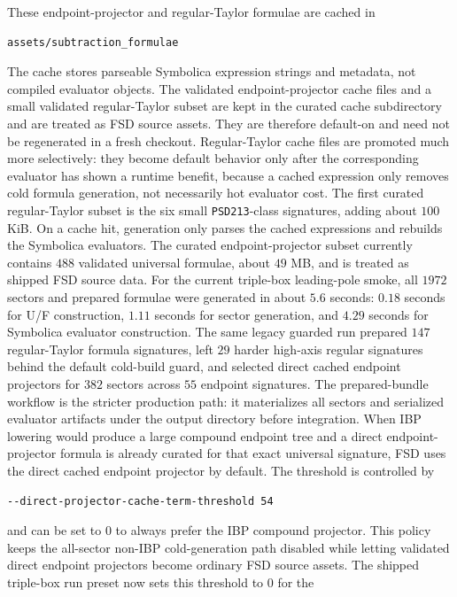 \documentclass[11pt]{article}
\begin{document}
These endpoint-projector and regular-Taylor formulae are cached in
\begin{lstlisting}[style=fsdcode]
assets/subtraction_formulae
\end{lstlisting}
The cache stores parseable Symbolica expression strings and metadata, not
compiled evaluator objects.  The validated endpoint-projector cache files and a
small validated regular-Taylor subset are kept in the curated cache
subdirectory and are treated as FSD source assets.  They are therefore
default-on and need not be regenerated in a fresh checkout.  Regular-Taylor
cache files are promoted much more selectively: they become default behavior
only after the corresponding evaluator has shown a runtime benefit, because a
cached expression only removes cold formula generation, not necessarily hot
evaluator cost.  The first curated regular-Taylor subset is the six small
\texttt{PSD213}-class signatures, adding about \(100\) KiB.  On a cache hit,
generation only parses the cached expressions and rebuilds the Symbolica
evaluators.  The curated endpoint-projector subset currently contains \(488\)
validated universal formulae, about \(49\) MB, and is treated as shipped FSD
source data.  For the current triple-box leading-pole smoke, all \(1972\)
sectors and prepared formulae were generated in about \(5.6\) seconds:
\(0.18\) seconds for U/F construction, \(1.11\) seconds for sector generation,
and \(4.29\) seconds for Symbolica evaluator construction.  The same legacy
guarded run prepared \(147\) regular-Taylor formula signatures, left \(29\)
harder high-axis regular signatures behind the default cold-build guard, and
selected direct cached endpoint projectors for \(382\) sectors across \(55\)
endpoint signatures.  The prepared-bundle workflow is the stricter production
path: it materializes all sectors and serialized evaluator artifacts under the
output directory before integration.
When IBP lowering would produce a large compound endpoint tree and a direct
endpoint-projector formula is already curated for that exact universal
signature, FSD uses the direct cached endpoint projector by default.  The
threshold is controlled by
\begin{lstlisting}[style=fsdcode]
--direct-projector-cache-term-threshold 54
\end{lstlisting}
and can be set to \(0\) to always prefer the IBP compound projector.  This
policy keeps the all-sector non-IBP cold-generation path disabled while letting
validated direct endpoint projectors become ordinary FSD source assets.
The shipped triple-box run preset now sets this threshold to \(0\) for the
\end{document}
